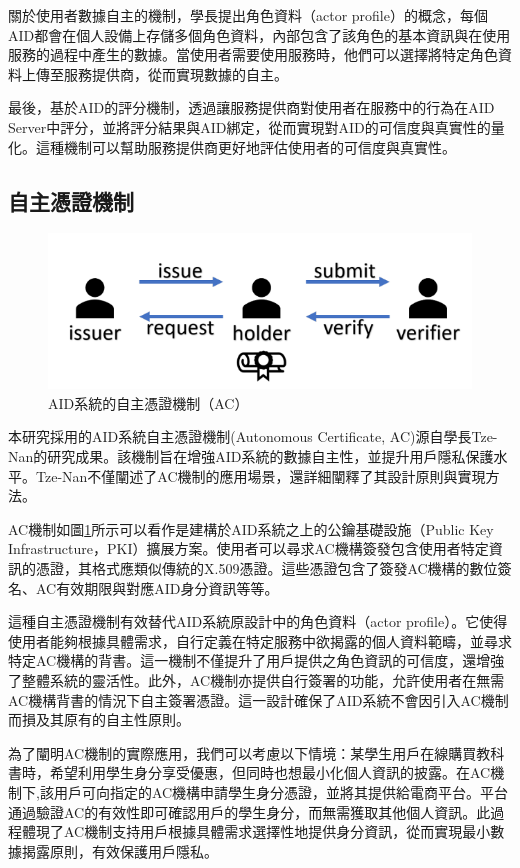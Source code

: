 關於使用者數據自主的機制，學長提出角色資料（actor profile）的概念，每個AID都會在個人設備上存儲多個角色資料，內部包含了該角色的基本資訊與在使用服務的過程中產生的數據。當使用者需要使用服務時，他們可以選擇將特定角色資料上傳至服務提供商，從而實現數據的自主。

最後，基於AID的評分機制，透過讓服務提供商對使用者在服務中的行為在AID Server中評分，並將評分結果與AID綁定，從而實現對AID的可信度與真實性的量化。這種機制可以幫助服務提供商更好地評估使用者的可信度與真實性。
\subsection{自主憑證機制}
\begin{figure}
  \centering
  \includegraphics[width=\linewidth,keepaspectratio]{figures/old-AC.png}
  \caption{AID系統的自主憑證機制（AC）}
  \label{fig:old-ac}
\end{figure}
本研究採用的AID系統自主憑證機制(Autonomous Certificate, AC)源自學長Tze-Nan\cite{NTU202102846}的研究成果。該機制旨在增強AID系統的數據自主性，並提升用戶隱私保護水平。Tze-Nan不僅闡述了AC機制的應用場景，還詳細闡釋了其設計原則與實現方法。

AC機制如圖\ref{fig:old-ac}所示可以看作是建構於AID系統之上的公鑰基礎設施（Public Key Infrastructure，PKI）擴展方案。使用者可以尋求AC機構簽發包含使用者特定資訊的憑證，其格式應類似傳統的X.509憑證\cite{itu-t-rec-x509}。這些憑證包含了簽發AC機構的數位簽名、AC有效期限與對應AID身分資訊等等。

這種自主憑證機制有效替代AID系統原設計中的角色資料（actor profile）。它使得使用者能夠根據具體需求，自行定義在特定服務中欲揭露的個人資料範疇，並尋求特定AC機構的背書。這一機制不僅提升了用戶提供之角色資訊的可信度，還增強了整體系統的靈活性。此外，AC機制亦提供自行簽署的功能，允許使用者在無需AC機構背書的情況下自主簽署憑證。這一設計確保了AID系統不會因引入AC機制而損及其原有的自主性原則。

為了闡明AC機制的實際應用，我們可以考慮以下情境：某學生用戶在線購買教科書時，希望利用學生身分享受優惠，但同時也想最小化個人資訊的披露。在AC機制下,該用戶可向指定的AC機構申請學生身分憑證，並將其提供給電商平台。平台通過驗證AC的有效性即可確認用戶的學生身分，而無需獲取其他個人資訊。此過程體現了AC機制支持用戶根據具體需求選擇性地提供身分資訊，從而實現最小數據揭露原則，有效保護用戶隱私。
